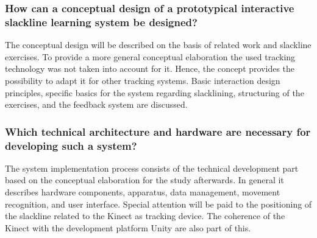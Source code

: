 \subsubsection{How can a conceptual design of a prototypical interactive slackline learning system be designed?}
The conceptual design will be described on the basis of related work and slackline exercises.
To provide a more general conceptual elaboration the used tracking technology was not taken into account for it.
Hence, the concept provides the possibility to adapt it for other tracking systems.
Basic interaction design principles, specific basics for the system regarding slacklining, structuring of the exercises, and the feedback system are discussed.

\subsubsection{Which technical architecture and hardware are necessary for developing such a system?}
The system implementation process consists of the technical development part based on the conceptual elaboration for the study afterwards.
In general it describes hardware components, apparatus, data management, movement recognition, and user interface.
Special attention will be paid to the positioning of the slackline related to the Kinect as tracking device.
The coherence of the Kinect with the development platform Unity are also part of this.

